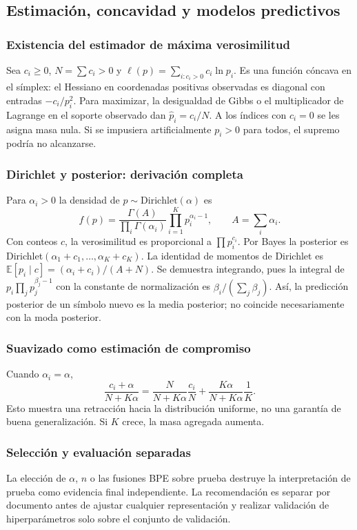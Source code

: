 \subsection{Estimación, concavidad y modelos predictivos}
\subsubsection{Existencia del estimador de máxima verosimilitud}
Sea $c_i\ge0$, $N=\sum c_i>0$ y
$\ell(p)=\sum_{i:c_i>0}c_i\ln p_i$. Es una función cóncava en el
símplex: el Hessiano en coordenadas positivas observadas es diagonal con
entradas $-c_i/p_i^2$. Para maximizar, la desigualdad de Gibbs o el
multiplicador de Lagrange en el soporte observado dan
$\widehat p_i=c_i/N$. A los índices con $c_i=0$ se les asigna masa nula.
Si se impusiera artificialmente $p_i>0$ para todos, el supremo podría no alcanzarse.
\subsubsection{Dirichlet y posterior: derivación completa}
Para $\alpha_i>0$ la densidad de $p\sim\mathrm{Dirichlet}(\alpha)$ es
\[
f(p)=\frac{\Gamma(A)}{\prod_i\Gamma(\alpha_i)}
\prod_{i=1}^Kp_i^{\alpha_i-1},\qquad A=\sum_i\alpha_i.
\]
Con conteos $c$, la verosimilitud es proporcional a $\prod p_i^{c_i}$.
Por Bayes la posterior es Dirichlet$(\alpha_1+c_1,\ldots,\alpha_K+c_K)$.
La identidad de momentos de Dirichlet es
$\mathbb E[p_i\mid c]=(\alpha_i+c_i)/(A+N)$.
Se demuestra integrando, pues la integral de $p_i\prod_j p_j^{\beta_j-1}$
con la constante de normalización es $\beta_i/(\sum_j\beta_j)$.
Así, la predicción posterior de un símbolo nuevo es la media posterior;
no coincide necesariamente con la moda posterior.
\subsubsection{Suavizado como estimación de compromiso}
Cuando $\alpha_i=\alpha$,
\[
\frac{c_i+\alpha}{N+K\alpha}
=\frac{N}{N+K\alpha}\frac{c_i}{N}+
\frac{K\alpha}{N+K\alpha}\frac1K.
\]
Esto muestra una retracción hacia la distribución uniforme, no una garantía
de buena generalización. Si $K$ crece, la masa agregada aumenta.
\subsubsection{Selección y evaluación separadas}
La elección de $\alpha$, $n$ o las fusiones BPE sobre prueba destruye la
interpretación de prueba como evidencia final independiente. La recomendación
es separar por documento antes de ajustar cualquier representación y realizar
validación de hiperparámetros solo sobre el conjunto de validación.

